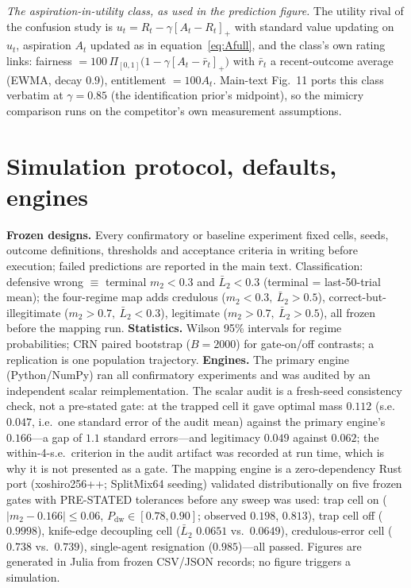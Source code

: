 \documentclass[11pt]{article}
\newcommand{\1}{\mathbf{1}}
\begin{document}
\emph{The aspiration-in-utility class, as used in the prediction figure.} The utility
rival of the confusion study is $u_t=R_t-\gamma[A_t-R_t]_+$ with standard value
updating on $u_t$, aspiration $A_t$ updated as in equation~\eqref{eq:Afull}, and the
class's own rating links: fairness $=100\,\Pi_{[0,1]}\!\big(1-\gamma[A_t-\bar r_t]_+\big)$
with $\bar r_t$ a recent-outcome average (EWMA, decay $0.9$), entitlement $=100A_t$.
Main-text Fig.~11 ports this class verbatim at $\gamma=0.85$ (the identification
prior's midpoint), so the mimicry comparison runs on the competitor's own measurement
assumptions.

\section{Simulation protocol, defaults, engines}
\label{s:protocol}

\textbf{Frozen designs.} Every confirmatory or baseline experiment fixed cells, seeds, outcome definitions, thresholds and acceptance criteria in writing before execution; failed predictions are reported in the main text. Classification: defensive wrong $\equiv$ terminal $m_2<0.3$ and $\bar L_2<0.3$ (terminal = last-50-trial mean); the four-regime map adds credulous ($m_2<0.3,\ \bar L_2>0.5$), correct-but-illegitimate ($m_2>0.7,\ \bar L_2<0.3$), legitimate ($m_2>0.7,\ \bar L_2>0.5$), all frozen before the mapping run. \textbf{Statistics.} Wilson 95\% intervals for regime probabilities; CRN paired bootstrap ($B=2000$) for gate-on/off contrasts; a replication is one population trajectory. \textbf{Engines.} The primary engine (Python/NumPy) ran all confirmatory experiments and was audited by an independent scalar reimplementation. The scalar audit is a fresh-seed consistency check, not a pre-stated gate: at the trapped cell it gave optimal mass $0.112$ (s.e.\ $0.047$, i.e.\ one standard error of the audit mean) against the primary engine's $0.166$---a gap of $1.1$ standard errors---and legitimacy $0.049$ against $0.062$; the within-4-s.e.\ criterion in the audit artifact was recorded at run time, which is why it is not presented as a gate. The mapping engine is a zero-dependency Rust port (xoshiro256++; SplitMix64 seeding) validated distributionally on five frozen gates with PRE-STATED tolerances before any sweep was used: trap cell on ($|m_2-0.166|\le0.06$, $P_{\mathrm{dw}}\in[0.78,0.90]$; observed $0.198$, $0.813$), trap cell off ($0.9998$), knife-edge decoupling cell ($\bar L_2$ $0.0651$ vs.\ $0.0649$), credulous-error cell ($0.738$ vs.\ $0.739$), single-agent resignation ($0.985$)---all passed. Figures are generated in Julia from frozen CSV/JSON records; no figure triggers a simulation.
\end{document}
